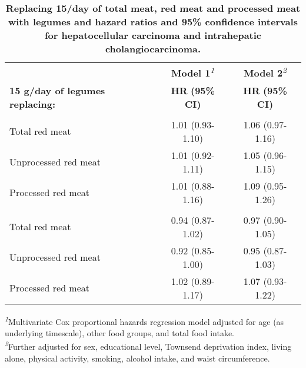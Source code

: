 \appendixstart
\appendix
\section[\appendixname]{}

\begin{table}[t]
\caption{
\label{tab:cancer}\textbf{Replacing 15/day of total meat, red meat and processed meat with legumes and hazard ratios and 95\% confidence intervals for hepatocellular carcinoma and intrahepatic cholangiocarcinoma.}}
\fontsize{9.0pt}{10.8pt}\selectfont
\begin{tabular*}{1\linewidth}{@{\extracolsep{\fill}}lcc}
\toprule
 & \textbf{Model 1}\textsuperscript{\textit{1}} & \textbf{Model 2}\textsuperscript{\textit{2}} \\
\cmidrule(lr){2-2} \cmidrule(lr){3-3}
\textbf{15 g/day of legumes replacing:} & \textbf{HR} \textbf{(95\% CI)} & \textbf{HR} \textbf{(95\% CI)} \\
\midrule\addlinespace[2.5pt]
\multicolumn{3}{l}{{\bfseries Hepatocellular carcinoma}} \\
\midrule\addlinespace[2.5pt]
Total red meat & 1.01 (0.93-1.10) & 1.06 (0.97-1.16) \\
Unprocessed red meat & 1.01 (0.92-1.11) & 1.05 (0.96-1.15) \\
Processed red meat & 1.01 (0.88-1.16) & 1.09 (0.95-1.26) \\
\midrule\addlinespace[2.5pt]
\multicolumn{3}{l}{{\bfseries Intrahepatic cholangiocarcinoma}} \\
\midrule\addlinespace[2.5pt]
Total red meat & 0.94 (0.87-1.02) & 0.97 (0.90-1.05) \\
Unprocessed red meat & 0.92 (0.85-1.00) & 0.95 (0.87-1.03) \\
Processed red meat & 1.02 (0.89-1.17) & 1.07 (0.93-1.22) \\
\bottomrule
\end{tabular*}
\begin{minipage}{\linewidth}
\textsuperscript{\textit{1}}Multivariate Cox proportional hazards regression model adjusted for age (as underlying timescale), other food groups, and total food intake.\\
\textsuperscript{\textit{2}}Further adjusted for sex, educational level, Townsend deprivation index, living alone, physical activity, smoking, alcohol intake, and waist circumference.\\
\end{minipage}
\end{table}
